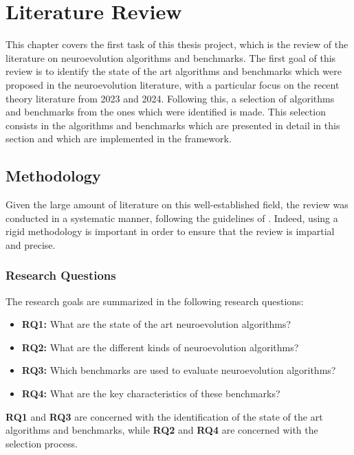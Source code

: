 \chapter{Literature Review}
\label{chap:review}

This chapter covers the first task of this thesis project, which is the review of the literature on neuroevolution algorithms and benchmarks.
The first goal of this review is to identify the state of the art algorithms and benchmarks which were proposed in the neuroevolution literature, with a particular
focus on the recent theory literature from 2023 and 2024. Following this, a selection of algorithms and benchmarks from the ones which were identified is made.
This selection consists in the algorithms and benchmarks which are presented in detail in this section and which are implemented in the framework.

\section{Methodology}

Given the large amount of literature on this well-established field, the review was conducted in a systematic manner, following the guidelines of \cite{...}.
Indeed, using a rigid methodology is important in order to ensure that the review is impartial and precise.

\subsection{Research Questions}

The research goals are summarized in the following research questions:

\begin{itemize}
    \item \textbf{RQ1:} What are the state of the art neuroevolution algorithms?
    \item \textbf{RQ2:} What are the different kinds of neuroevolution algorithms?
    \item \textbf{RQ3:} Which benchmarks are used to evaluate neuroevolution algorithms?
    \item \textbf{RQ4:} What are the key characteristics of these benchmarks?
\end{itemize}

\textbf{RQ1} and \textbf{RQ3} are concerned with the identification of the state of the art algorithms and benchmarks, while \textbf{RQ2} and \textbf{RQ4} are concerned
with the selection process.

